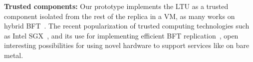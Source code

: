 \textbf{Trusted components:}
Our prototype implements the LTU as a trusted component isolated from the rest of the replica in a VM, as many works on hybrid BFT~\cite{Veronese:2013,Roeder:2010,Platania:2014,Sousa:2010,Distler:2011}.
The recent popularization of trusted computing technologies such as Intel SGX~\cite{sgx}, and its use for implementing efficient BFT replication~\cite{Behl:2017}, open interesting possibilities for using novel hardware to support services like \system on bare metal.





